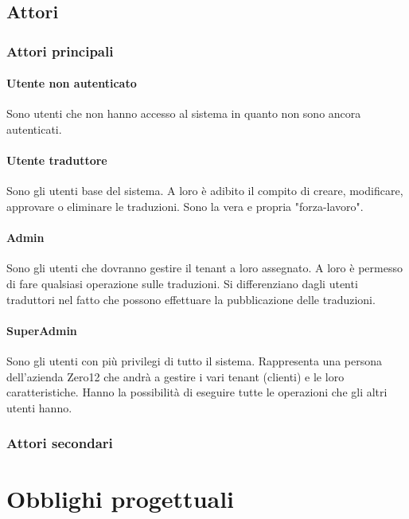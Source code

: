 \subsection{Attori}
    \subsubsection{Attori principali}
        \paragraph{Utente non autenticato}
        Sono utenti che non hanno accesso al sistema in quanto non sono ancora autenticati.
        \paragraph{Utente traduttore}
        Sono gli utenti base del sistema. A loro è adibito il compito di creare, modificare, approvare o eliminare le traduzioni. Sono la vera e propria "forza-lavoro".
        \paragraph{Admin}
        Sono gli utenti che dovranno gestire il tenant a loro assegnato. A loro è permesso di fare qualsiasi operazione sulle traduzioni. Si differenziano dagli utenti traduttori nel fatto che possono effettuare la pubblicazione delle traduzioni.
        \paragraph{SuperAdmin}
        Sono gli utenti con più privilegi di tutto il sistema. Rappresenta una persona dell'azienda Zero12 che andrà a gestire i vari tenant (clienti) e le loro caratteristiche. Hanno la possibilità di eseguire tutte le operazioni che gli altri utenti hanno.
    \subsubsection{Attori secondari}
\section{Obblighi progettuali}